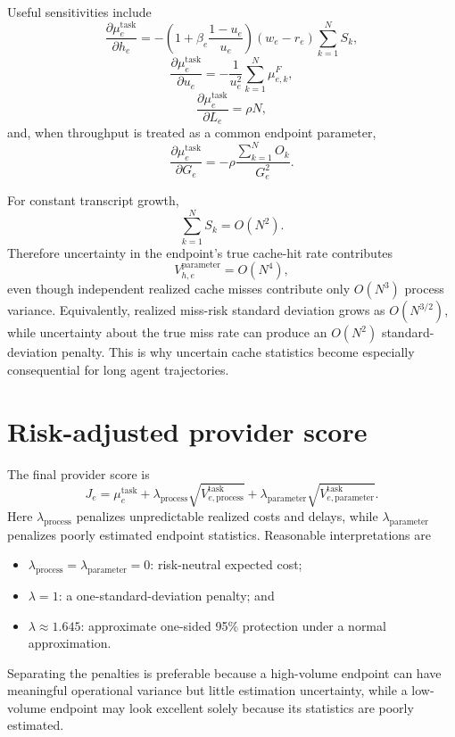 \documentclass[11pt]{article}
\begin{document}
Useful sensitivities include
\begin{equation}
\frac{\partial\mu_e^{\mathrm{task}}}{\partial h_e}
=-
\left(1+\beta_e\frac{1-u_e}{u_e}\right)
(w_e-r_e)\sum_{k=1}^{N}S_k,
\end{equation}
\begin{equation}
\frac{\partial\mu_e^{\mathrm{task}}}{\partial u_e}
=-\frac{1}{u_e^2}\sum_{k=1}^{N}\mu_{e,k}^F,
\end{equation}
\begin{equation}
\frac{\partial\mu_e^{\mathrm{task}}}{\partial L_e}=\rho N,
\end{equation}
and, when throughput is treated as a common endpoint parameter,
\begin{equation}
\frac{\partial\mu_e^{\mathrm{task}}}{\partial G_e}
=-\rho\frac{\sum_{k=1}^{N}O_k}{G_e^2}.
\end{equation}

For constant transcript growth,
\begin{equation}
\sum_{k=1}^{N}S_k=O(N^2).
\end{equation}
Therefore uncertainty in the endpoint's true cache-hit rate contributes
\begin{equation}
V_{h,e}^{\mathrm{parameter}}=O(N^4),
\end{equation}
even though independent realized cache misses contribute only $O(N^3)$ process
variance. Equivalently, realized miss-risk standard deviation grows as
$O(N^{3/2})$, while uncertainty about the true miss rate can produce an
$O(N^2)$ standard-deviation penalty. This is why uncertain cache statistics
become especially consequential for long agent trajectories.

\section{Risk-adjusted provider score}

The final provider score is
\begin{equation}
\boxed{
J_e
=\mu_e^{\mathrm{task}}
+\lambda_{\mathrm{process}}
 \sqrt{V_{e,\mathrm{process}}^{\mathrm{task}}}
+\lambda_{\mathrm{parameter}}
 \sqrt{V_{e,\mathrm{parameter}}^{\mathrm{task}}}
}.
\end{equation}
Here $\lambda_{\mathrm{process}}$ penalizes unpredictable realized costs and
delays, while $\lambda_{\mathrm{parameter}}$ penalizes poorly estimated endpoint
statistics. Reasonable interpretations are
\begin{itemize}[nosep]
  \item $\lambda_{\mathrm{process}}=\lambda_{\mathrm{parameter}}=0$: risk-neutral
        expected cost;
  \item $\lambda=1$: a one-standard-deviation penalty; and
  \item $\lambda\approx1.645$: approximate one-sided 95\% protection under a
        normal approximation.
\end{itemize}
Separating the penalties is preferable because a high-volume endpoint can have
meaningful operational variance but little estimation uncertainty, while a
low-volume endpoint may look excellent solely because its statistics are poorly
estimated.
\end{document}
